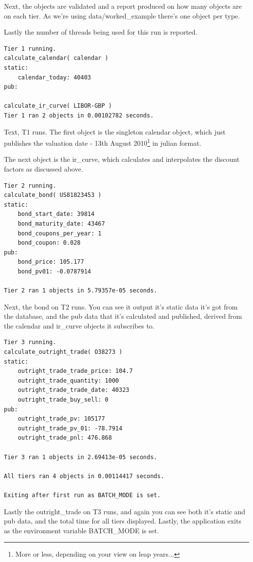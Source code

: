 \documentclass{report}
\begin{document}
Next, the objects are validated and a report produced on how many objects are on each tier. As we're using data/worked_example there's one object per type. 

Lastly the number of threads being used for this run is reported.

\begin{verbatim}
Tier 1 running.
calculate_calendar( calendar )
static:
    calendar_today: 40403
pub:

calculate_ir_curve( LIBOR-GBP )
Tier 1 ran 2 objects in 0.00102782 seconds.
\end{verbatim}

Text, T1 runs. The first object is the singleton calendar object, which just publishes the valuation date - 13th August 2010\footnote{More or less, depending on your view on leap years...} in julian format.

The next object is the ir_curve, which calculates and interpolates the discount factors as discussed above.

\begin{verbatim}
Tier 2 running.
calculate_bond( US81823453 )
static:
    bond_start_date: 39814
    bond_maturity_date: 43467
    bond_coupons_per_year: 1
    bond_coupon: 0.028
pub:
    bond_price: 105.177
    bond_pv01: -0.0787914

Tier 2 ran 1 objects in 5.79357e-05 seconds.
\end{verbatim}

Next, the bond on T2 runs. You can see it output it's static data it's got from the database, and the pub data that it's calculated and published, derived from the calendar and ir_curve objects it subscribes to.

\begin{verbatim}
Tier 3 running.
calculate_outright_trade( O38273 )
static:
    outright_trade_trade_price: 104.7
    outright_trade_quantity: 1000
    outright_trade_trade_date: 40323
    outright_trade_buy_sell: 0
pub:
    outright_trade_pv: 105177
    outright_trade_pv_01: -78.7914
    outright_trade_pnl: 476.868

Tier 3 ran 1 objects in 2.69413e-05 seconds.

All tiers ran 4 objects in 0.00114417 seconds.

Exiting after first run as BATCH_MODE is set.
\end{verbatim}

Lastly the outright_trade on T3 runs, and again you can see both it's static and pub data, and the total time for all tiers displayed. Lastly, the application exits as the environment variable BATCH_MODE is set.
\end{document}
